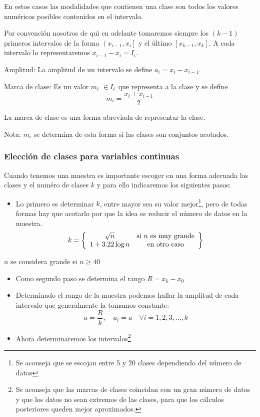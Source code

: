 En estos casos las modalidades que contienen una clase son todos los valores
num\'{e}ricos posibles contenidos en el intervalo.

Por convenci\'{o}n nosotros de qu\'{\i} en adelante tomaremos siempre los
$(k-1)$ primeros intervalos de la forma $\left(  x_{i-1},x_{i}\right]  $ y el
\'{u}ltimo $[x_{k-1},x_{k}].$ A cada intervalo lo representaremos
$x_{i-1}-x_{i}=I_{i}$.

\begin{definition}
Amplitud: La amplitud de un intervalo se define $a_{i}=x_{i}-x_{i-1}.$
\end{definition}

\begin{definition}
Marca de clase: Es un valor $m_{i}$ $\in I_{i\text{ }}$que representa a la
clase y se define
\[
m_{i}=\frac{x_{i}+x_{i-1}}{2}
\]

\end{definition}

La marca de clase es una forma abreviada de representar la clase.

Nota: $m_{i}$ se determina de esta forma si las clases son conjuntos acotados.

\subsubsection{Elecci\'{o}n de clases para variables continuas}

Cuando tenemos una muestra es importante escoger en una forma adecuada las
clases y el num\'{e}ro de clases $k$ y para ello indicaremos los siguientes pasos:

\begin{itemize}
\item Lo primero es determinar $k$, entre mayor sea su valor mejor\footnote{Se
aconseja que se escojan entre 5 y 20 clases dependiendo del n\'{u}mero de
datos}, pero de todas formas hay que acotarlo por que la idea es reducir el
n\'{u}mero de datos en la muestra.
\[
k=\left\{
\begin{array}
[c]{cc}%
\sqrt{n} & \text{si }n\text{ es muy grande}\\
1+3.22\log n & \text{en otro caso}%
\end{array}
\right\}
\]

\end{itemize}

$n$ se considera grande si $n\geq40$

\begin{itemize}
\item Como segundo paso se determina el rango $R=x_{k}-x_{0}$

\item Determinado el rango de la muestra podemos hallar la amplitud de cada
intervalo que generalmente la tomamos constante:
\[
a=\frac{R}{k},\quad a_{i}=a\quad\forall i=1,2,3,...,k
\]


\item Ahora determinaremos los intervalos\footnote{Se aconseja que las marcas
de clases coincidan con un gran n\'{u}mero de datos y que los datos no sean
extremos de las clases, para que los c{\'a}lculos posteriores queden mejor
aproximados.}
\end{itemize}


